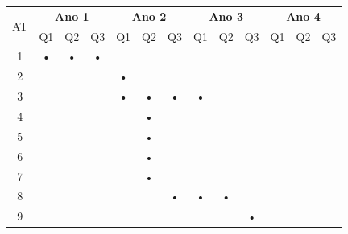 \documentclass[12pt]{article}
\begin{document}
\begin{table}[htbp]
	\centering
	\begin{tabular}{|c|c|c|c|c|c|c|c|c|c|c|c|c|}
	\hline
	\multirow{2}{*}{AT} & \multicolumn{3}{c|}{\textbf{Ano 1}} & \multicolumn{3}{c|}{\textbf{Ano 2}} & \multicolumn{3}{c|}{\textbf{Ano 3}} & \multicolumn{3}{c|}{\textbf{Ano 4}} \\ \cline{2-13} 
											& Q1         & Q2         & Q3        & Q1         & Q2         & Q3        & Q1         & Q2         & Q3        & Q1         & Q2         & Q3        \\ \hline
	1                   & •          & •          & •         &            &            &           &            &            &           &            &            &           \\ \hline
	2                   &            &            &           & •          &            &           &            &            &           &            &            &           \\ \hline
	3                   &            &            &           & •          & •          & •         & •          &            &           &            &            &           \\ \hline
	4                   &            &            &           &            & •          &           &            &            &           &            &            &           \\ \hline
	5                   &            &            &           &            & •          &           &            &            &           &            &            &           \\ \hline
	6                   &            &            &           &            & •          &           &            &            &           &            &            &           \\ \hline
	7                   &            &            &           &            & •          &           &            &            &           &            &            &           \\ \hline
	8                   &            &            &           &            &            & •         & •          & •          &           &            &            &           \\ \hline
	9                   &            &            &           &            &            &           &            &            & •         &            &            &           \\ \hline

\end{tabular}
\end{table}
\end{document}
